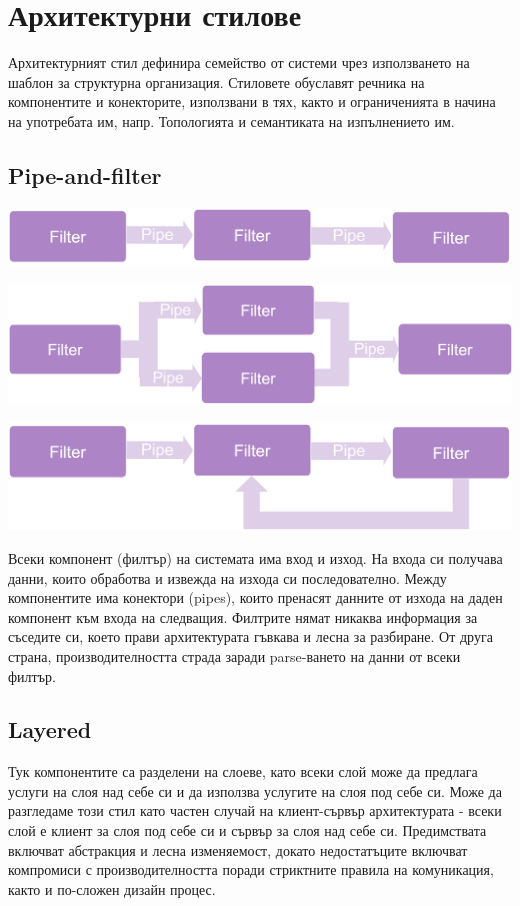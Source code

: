 \documentclass[fleqn,12pt]{article}
\begin{document}
\section{Архитектурни стилове}

Архитектурният стил дефинира семейство от системи чрез използването на
шаблон за структурна организация.
Стиловете обуславят речника на компонентите и конекторите, използвани в тях, както и ограниченията в начина на употребата им, напр. Топологията и семантиката на изпълнението им.

\subsection{Pipe-and-filter}
\includegraphics[width=175mm]{paf_simple.png}

\includegraphics[width=175mm]{paf_branched.png}

\includegraphics[width=175mm]{paf_loop.png}

Всеки компонент (филтър) на системата има вход и изход. На входа си получава данни, които обработва и извежда на изхода си последователно. Между компонентите има конектори (pipes), които пренасят данните от изхода на даден компонент към входа на следващия. Филтрите нямат никаква информация за съседите си, което прави архитектурата гъвкава и лесна за разбиране. От друга страна, производителността страда заради parse-ването на данни от всеки филтър.

\subsection{Layered}
Тук компонентите са разделени на слоеве, като всеки слой може да предлага услуги на слоя над себе си и да използва услугите на слоя под себе си. Може да разгледаме този стил като частен случай на клиент-сървър архитектурата - всеки слой е клиент за слоя под себе си и сървър за слоя над себе си. Предимствата включват абстракция и лесна изменяемост, докато недостатъците включват компромиси с производителността поради стриктните правила на комуникация, както и по-сложен дизайн процес.
\end{document}
